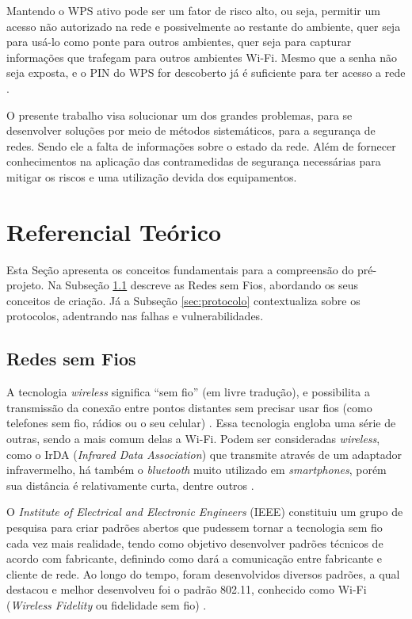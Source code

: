 \documentclass[
	article,			%
	11pt,				%
	oneside,			%
	a4paper,			%
	english,			%
	brazil,				%
	sumario=tradicional
	]{abntex2}
\begin{document}
Mantendo o WPS ativo pode ser um fator de risco alto, ou seja, permitir um acesso não autorizado na rede e possivelmente  ao restante do ambiente, quer seja para usá-lo como ponte para outros ambientes, quer seja para capturar informações que trafegam para outros ambientes 
Wi-Fi. Mesmo que a senha não seja exposta, e o PIN do WPS for descoberto já é suficiente para ter acesso a rede \cite{rufino2019segurancca}.

O presente trabalho visa solucionar um dos grandes problemas, para se desenvolver soluções por meio de métodos sistemáticos, para a segurança de redes. Sendo ele a falta de informações sobre o estado da rede. Além de fornecer conhecimentos na aplicação das contramedidas de segurança necessárias para mitigar os riscos e uma utilização devida dos equipamentos.

\section{Referencial Teórico}
Esta Seção apresenta os conceitos fundamentais para a compreensão do pré-projeto. Na Subseção \ref{sec:wifi} descreve as Redes sem Fios, abordando os seus conceitos de criação. Já a Subseção \ref{sec:protocolo} contextualiza sobre os protocolos, adentrando nas falhas e vulnerabilidades. 

\subsection{Redes sem Fios}
\label{sec:wifi}
A tecnologia \textit{wireless} significa “sem fio” (em livre tradução), e possibilita a transmissão da conexão entre pontos distantes sem precisar usar fios (como telefones sem fio, rádios ou o seu celular) \cite{cancelaimportancia}. Essa tecnologia engloba uma série de outras, sendo a mais comum delas a Wi-Fi. Podem ser consideradas \textit{wireless}, como o IrDA (\textit{Infrared Data Association}) que transmite através de um adaptador infravermelho, há também o \textit{bluetooth} muito utilizado em \textit{smartphones}, porém sua distância é relativamente curta, dentre outros \cite{engst2005kit}.

O \textit{Institute of Electrical and Electronic Engineers} (IEEE) constituiu um grupo de pesquisa para criar padrões abertos que pudessem tornar a tecnologia sem fio cada vez mais realidade, tendo como objetivo desenvolver padrões técnicos de acordo com fabricante, definindo como dará a comunicação entre fabricante e cliente de rede. Ao longo do tempo, foram desenvolvidos diversos padrões, a qual destacou e melhor desenvolveu foi o padrão 802.11, conhecido como Wi-Fi (\textit{Wireless Fidelity} ou fidelidade sem fio) \cite{rufino2019segurancca}.
\end{document}
